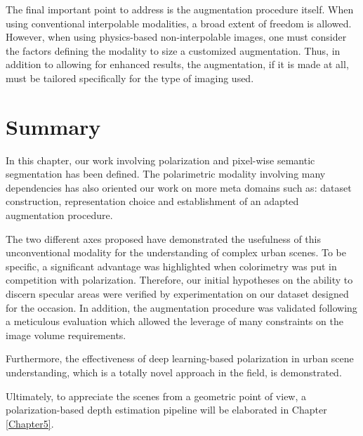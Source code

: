 The final important point to address is the augmentation procedure itself. When using conventional interpolable modalities, a broad extent of freedom is allowed. However, when using physics-based non-interpolable images, one must consider the factors defining the modality to size a customized augmentation. Thus, in addition to allowing for enhanced results, the augmentation, if it is made at all, must be tailored specifically for the type of imaging used.


\section{Summary}\label{sum_4}

In this chapter, our work involving polarization and pixel-wise semantic segmentation has been defined.
The polarimetric modality involving many dependencies has also oriented our work on more meta domains such as: dataset construction, representation choice and establishment of an adapted augmentation procedure.

The two different axes proposed have demonstrated the usefulness of this unconventional modality for the understanding of complex urban scenes. To be specific, a significant advantage was highlighted when colorimetry was put in competition with polarization. Therefore, our initial hypotheses on the ability to discern specular areas were verified by experimentation on our dataset designed for the occasion.
In addition, the augmentation procedure was validated following a meticulous evaluation which allowed the leverage of many constraints on the image volume requirements.

Furthermore, the effectiveness of deep learning-based polarization in urban scene understanding, which is a totally novel approach in the field, is demonstrated.

Ultimately, to appreciate the scenes from a geometric point of view, a polarization-based depth estimation pipeline will be elaborated in Chapter \ref{Chapter5}.



